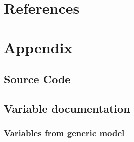 \documentclass[11pt]{article}
\begin{document}
\section{References}

\section{Appendix}
\subsection{Source Code}
\subsection{Variable documentation}
\subsubsection{Variables from generic model}
\end{document}
